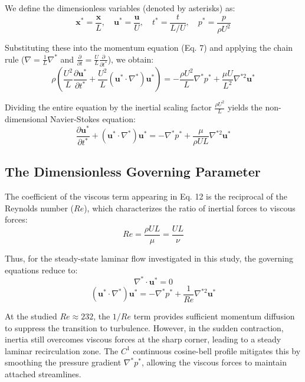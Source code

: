 \documentclass[12pt, a4paper]{article}
\begin{document}
We define the dimensionless variables (denoted by asterisks) as:
\begin{equation}
	\mathbf{x}^* = \frac{\mathbf{x}}{L}, \quad \mathbf{u}^* = \frac{\mathbf{u}}{U}, \quad t^* = \frac{t}{L/U}, \quad p^* = \frac{p}{\rho U^2}
\end{equation}

Substituting these into the momentum equation (Eq. 7) and applying the chain rule ($\nabla = \frac{1}{L} \nabla^*$ and $\frac{\partial}{\partial t} = \frac{U}{L} \frac{\partial}{\partial t^*}$), we obtain:
\begin{equation}
	\rho \left( \frac{U^2}{L} \frac{\partial \mathbf{u}^*}{\partial t^*} + \frac{U^2}{L} (\mathbf{u}^* \cdot \nabla^*)\mathbf{u}^* \right) = -\frac{\rho U^2}{L} \nabla^* p^* + \frac{\mu U}{L^2} \nabla^{*2} \mathbf{u}^*
\end{equation}

Dividing the entire equation by the inertial scaling factor $\frac{\rho U^2}{L}$ yields the non-dimensional Navier-Stokes equation:
\begin{equation}
	\frac{\partial \mathbf{u}^*}{\partial t^*} + (\mathbf{u}^* \cdot \nabla^*)\mathbf{u}^* = -\nabla^* p^* + \frac{\mu}{\rho U L} \nabla^{*2} \mathbf{u}^*
\end{equation}

\subsection{The Dimensionless Governing Parameter}
The coefficient of the viscous term appearing in Eq. 12 is the reciprocal of the Reynolds number ($Re$), which characterizes the ratio of inertial forces to viscous forces:
\begin{equation}
	Re = \frac{\rho U L}{\mu} = \frac{U L}{\nu}
\end{equation}

Thus, for the steady-state laminar flow investigated in this study, the governing equations reduce to:
\begin{equation}
	\nabla^* \cdot \mathbf{u}^* = 0
\end{equation}
\begin{equation}
	(\mathbf{u}^* \cdot \nabla^*)\mathbf{u}^* = -\nabla^* p^* + \frac{1}{Re} \nabla^{*2} \mathbf{u}^*
\end{equation}

At the studied $Re \approx 232$, the $1/Re$ term provides sufficient momentum diffusion to suppress the transition to turbulence. However, in the sudden contraction, inertia still overcomes viscous forces at the sharp corner, leading to a steady laminar recirculation zone. The $C^1$ continuous cosine-bell profile mitigates this by smoothing the pressure gradient $\nabla^* p^*$, allowing the viscous forces to maintain attached streamlines.
\end{document}
